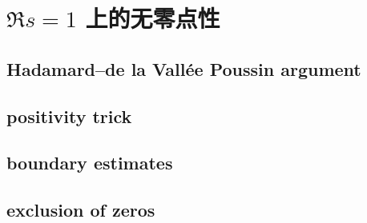 \section{\texorpdfstring{\(\Re s=1\)}{Re(s)=1} 上的无零点性}
\label{b3:sec:2703}


\subsection{Hadamard–de la Vallée Poussin argument}
\label{b3:subsec:270301}

\subsection{positivity trick}
\label{b3:subsec:270302}

\subsection{boundary estimates}
\label{b3:subsec:270303}

\subsection{exclusion of zeros}
\label{b3:subsec:270304}


